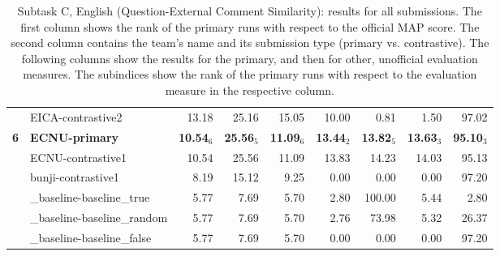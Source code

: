 \begin{table*}[tbh]
\begin{center}
\begin{tabular}{clrrrrrrr}
& EICA-contrastive2 & 13.18 & \scriptsize 25.16 & \scriptsize 15.05 & \scriptsize 10.00 & \scriptsize  0.81 & \scriptsize  1.50 & \scriptsize 97.02 \\
\bf 6 & \bf ECNU-primary & \bf 10.54$_{6}$ & \bf \scriptsize 25.56$_{5}$ & \bf \scriptsize 11.09$_{6}$ & \bf \scriptsize 13.44$_{2}$ & \bf \scriptsize 13.82$_{5}$ & \bf \scriptsize 13.63$_{3}$ & \bf \scriptsize 95.10$_{3}$ \\
& ECNU-contrastive1 & 10.54 & \scriptsize 25.56 & \scriptsize 11.09 & \scriptsize 13.83 & \scriptsize 14.23 & \scriptsize 14.03 & \scriptsize 95.13 \\
& bunji-contrastive1 &  8.19 & \scriptsize 15.12 & \scriptsize  9.25 & \scriptsize  0.00 & \scriptsize  0.00 & \scriptsize  0.00 & \scriptsize 97.20 \\
& \_baseline-baseline\_true &  5.77 & \scriptsize  7.69 & \scriptsize  5.70 & \scriptsize  2.80 & \scriptsize 100.00 & \scriptsize  5.44 & \scriptsize  2.80 \\
& \_baseline-baseline\_random &  5.77 & \scriptsize  7.69 & \scriptsize  5.70 & \scriptsize  2.76 & \scriptsize 73.98 & \scriptsize  5.32 & \scriptsize 26.37 \\
& \_baseline-baseline\_false &  5.77 & \scriptsize  7.69 & \scriptsize  5.70 & \scriptsize  0.00 & \scriptsize  0.00 & \scriptsize  0.00 & \scriptsize 97.20 \\
\end{tabular}
\caption{Subtask C, English (Question-External Comment Similarity): results for all submissions. The first column shows the rank of the primary runs with respect to the official MAP score. The second column contains the team's name and its submission type (primary vs. contrastive). The following columns show the results for the primary, and then for other, unofficial evaluation measures. The subindices show the rank of the primary runs with respect to the evaluation measure in the respective column.}
\label{table:results}
\end{center}
\end{table*}
